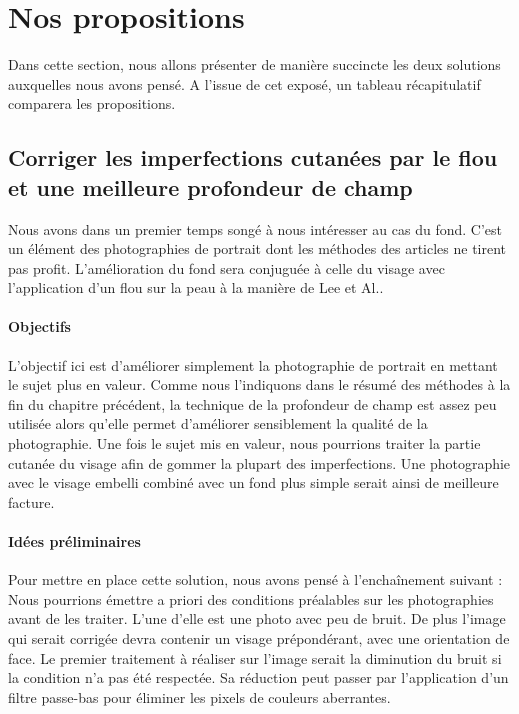 \documentclass[11pt, french,screen]{report-rd-info}
\begin{document}
\section{Nos propositions}
Dans cette section, nous allons présenter de manière succincte les deux solutions auxquelles nous avons pensé. A l’issue de cet exposé, un tableau récapitulatif comparera les propositions.
\subsection{Corriger les imperfections cutanées par le flou et une meilleure profondeur de champ}
\label{propun}
Nous avons dans un premier temps songé à nous intéresser au cas du fond. C’est un élément des photographies de portrait dont les méthodes des articles ne tirent pas profit. L’amélioration du fond sera conjuguée à celle du visage avec l’application d’un flou sur la peau à la manière de Lee et Al.\cite{Lee}.
\paragraph{Objectifs}
L’objectif ici est d’améliorer simplement la photographie de portrait en mettant le sujet plus en valeur. Comme nous l’indiquons dans le résumé des méthodes à la fin du chapitre précédent, la technique de la profondeur de champ est assez peu utilisée alors qu’elle permet d’améliorer sensiblement la qualité de la photographie. Une fois le sujet mis en valeur, nous pourrions traiter la partie cutanée du visage afin de gommer la plupart des imperfections. Une photographie avec le visage embelli combiné avec un fond plus simple serait ainsi de meilleure facture.
\paragraph{Idées préliminaires}
Pour mettre en place cette solution, nous avons pensé à l'enchaînement suivant :
Nous pourrions émettre a priori des conditions préalables sur les photographies avant de les traiter. L’une d’elle est une photo avec peu de bruit. De plus l’image qui serait corrigée devra contenir un visage prépondérant, avec une orientation de face.
Le premier traitement à réaliser sur l’image serait la diminution du bruit si la condition n’a pas été respectée. Sa réduction peut passer par l’application d’un filtre passe-bas pour éliminer les pixels de couleurs aberrantes.
\end{document}
